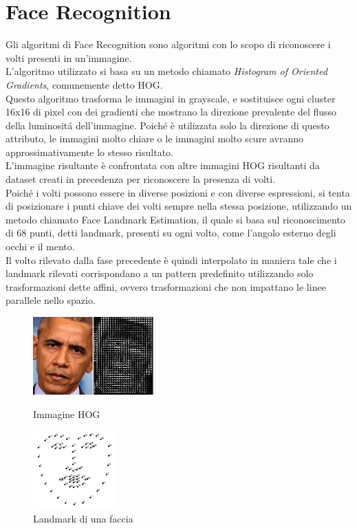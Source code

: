 \documentclass{report}
\begin{document}
\section{Face Recognition}
Gli algoritmi di Face Recognition sono algoritmi con lo scopo di riconoscere i volti presenti in un’immagine. \\
L’algoritmo utilizzato si basa su un metodo chiamato \textit{Histogram of Oriented Gradients}, comunemente detto HOG. \\
Questo algoritmo trasforma le immagini in grayscale, e sostituisce ogni cluster 16x16 di pixel con dei gradienti che mostrano la direzione prevalente del flusso della luminositá dell’immagine. Poiché è utilizzata solo la direzione di questo attributo, le immagini molto chiare o le immagini molto scure avranno approssimativamente lo stesso risultato. \\
L’immagine risultante è confrontata con altre immagini HOG risultanti da dataset creati in precedenza per riconoscere la presenza di volti. \\
Poiché i volti possono essere in diverse posizioni e con diverse espressioni, si tenta di posizionare i punti chiave dei volti sempre nella stessa posizione, utilizzando un metodo chiamato Face Landmark Estimation, il quale si basa sul riconoscimento di 68 punti, detti landmark, presenti su ogni volto, come l’angolo esterno degli occhi e il mento. \\
Il volto rilevato dalla fase precedente è quindi interpolato in maniera tale che i landmark rilevati corrispondano a un pattern predefinito utilizzando solo trasformazioni dette affini, ovvero trasformazioni che non impattano le linee parallele nello spazio. \\
\begin{samepage}
    \begin{figure}[!htb]
    \begin{minipage}{0.48\textwidth}
        \centering
        \includegraphics[height=3cm]{hog_obama.jpg}
        \caption{Immagine HOG}
    \end{minipage}\hfill
    \begin{minipage}{0.48\textwidth}
        \centering
        \includegraphics[height=3cm]{landmark.png}
        \caption{Landmark di una faccia}
    \end{minipage}\hfill
    \end{figure}
\end{samepage}
\end{document}
